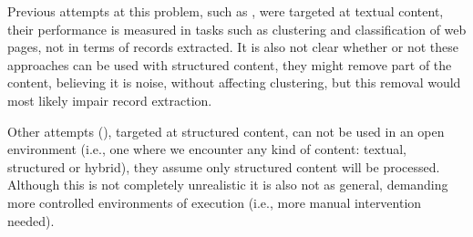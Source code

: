 Previous attempts at this problem, such as \cite{Densiometric08,Noisy03,
Boilerplate10, vieira2006fast}, were targeted at textual content, their
performance is measured in tasks such as clustering and classification of web
pages, not in terms of records extracted. It is also not clear whether or not
these approaches can be used with structured content, they might remove part of the content,
believing it is noise, without affecting clustering, but this removal would most
likely impair record extraction.
 

 Other attempts (\cite{TPS2013,Velloso:2017:ERW:3132847.3132875}), targeted at
structured content, can not be used in an open environment (i.e., one where we
encounter any kind of content: textual, structured  or hybrid), they assume only
structured content will be processed. Although this is not completely
unrealistic it is also not as general, demanding more controlled environments of
execution (i.e., more manual intervention needed).




